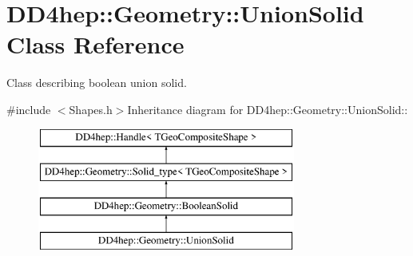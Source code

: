 \hypertarget{class_d_d4hep_1_1_geometry_1_1_union_solid}{
\section{DD4hep::Geometry::UnionSolid Class Reference}
\label{class_d_d4hep_1_1_geometry_1_1_union_solid}
}


Class describing boolean union solid.  


{\ttfamily \#include $<$Shapes.h$>$}Inheritance diagram for DD4hep::Geometry::UnionSolid::\begin{figure}[H]
\begin{center}
\leavevmode
\includegraphics[height=4cm]{class_d_d4hep_1_1_geometry_1_1_union_solid}
\end{center}
\end{figure}
